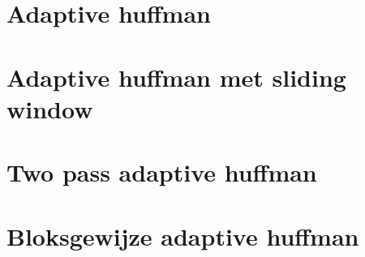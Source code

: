 \documentclass[a4paper,12pt]{report}
\begin{document}
\section{Adaptive huffman}


\section{Adaptive huffman met sliding window}

\section{Two pass adaptive huffman}

\section{Bloksgewijze adaptive huffman}

\end{document}
